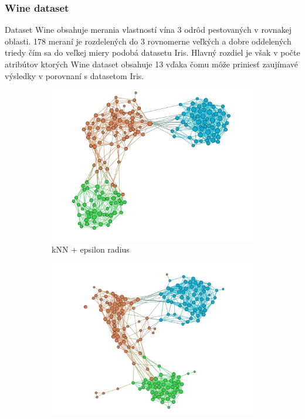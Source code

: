 \documentclass[slovak,master,dept460,male,cpp,cpdeclaration]{diploma}
\begin{document}
\subsubsection{Wine dataset}
Dataset Wine obsahuje merania vlastností vína 3 odrôd pestovaných v rovnakej oblasti. 178 meraní je rozdelených do 3 rovnomerne veľkých a dobre oddelených triedy čím sa do veľkej miery podobá datasetu Iris. Hlavný rozdiel je však v počte atribútov ktorých Wine dataset obsahuje 13 vďaka čomu môže priniesť zaujímavé výsledky v porovnaní s datasetom Iris. \cite{wine}
\begin{figure}[H]
\centering
\begin{subfigure}{0.45\textwidth}
    \centering
    \includegraphics[width=\linewidth, frame]{Graphs/network_wine_knn_epsilon.jpg}
    \caption{kNN + epsilon radius}
    \label{fig:wine_knn_eps}
\end{subfigure}\hfil
\begin{subfigure}{0.45\textwidth}
    \centering
    \includegraphics[width=\linewidth, frame]{Graphs/network_wine_nnn.jpg}

\end{subfigure}
\end{figure}
\end{document}
